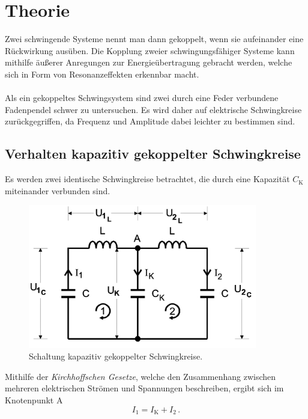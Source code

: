\section{Theorie}
\label{sec:Theorie}

Zwei schwingende Systeme nennt man dann gekoppelt, wenn sie aufeinander eine Rückwirkung ausüben. 
Die Kopplung zweier schwingungsfähiger Systeme kann mithilfe äußerer Anregungen zur Energieübertragung gebracht werden, 
welche sich in Form von Resonanzeffekten erkennbar macht.\\
\\
Als ein gekoppeltes Schwingsystem sind zwei durch eine Feder verbundene Fadenpendel schwer zu untersuchen.
Es wird daher auf elektrische Schwingkreise zurückgegriffen, da Frequenz und Amplitude dabei leichter zu bestimmen sind.

\subsection {Verhalten kapazitiv gekoppelter Schwingkreise}

Es werden zwei identische Schwingkreise betrachtet, die durch eine Kapazität $C_\text{K}$ miteinander verbunden sind.

\begin{figure} 
    \centering
    \includegraphics[width=10cm] {pictures/prinzipschaltbild.png}  
    \caption{Schaltung kapazitiv gekoppelter Schwingkreise. \cite{v355}}
    \label{fig:prinzipschaltbild}
\end{figure} 

Mithilfe der \textit{Kirchhoffschen Gesetze}, welche den Zusammenhang zwischen mehreren elektrischen Strömen und Spannungen 
beschreiben, ergibt sich im Knotenpunkt A
\begin{equation}
    I_{1} = I_\text{K} + I_{2} \,.
\end{equation}

